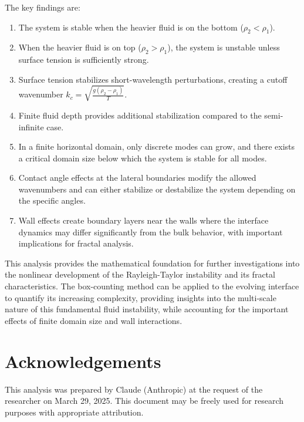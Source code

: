 \documentclass[12pt,a4paper]{article}
\begin{document}
The key findings are:
\begin{enumerate}
    \item The system is stable when the heavier fluid is on the bottom ($\rho_2 < \rho_1$).
    \item When the heavier fluid is on top ($\rho_2 > \rho_1$), the system is unstable unless surface tension is sufficiently strong.
    \item Surface tension stabilizes short-wavelength perturbations, creating a cutoff wavenumber $k_c = \sqrt{\frac{g(\rho_2 - \rho_1)}{T}}$.
    \item Finite fluid depth provides additional stabilization compared to the semi-infinite case.
    \item In a finite horizontal domain, only discrete modes can grow, and there exists a critical domain size below which the system is stable for all modes.
    \item Contact angle effects at the lateral boundaries modify the allowed wavenumbers and can either stabilize or destabilize the system depending on the specific angles.
    \item Wall effects create boundary layers near the walls where the interface dynamics may differ significantly from the bulk behavior, with important implications for fractal analysis.
\end{enumerate}

This analysis provides the mathematical foundation for further investigations into the nonlinear development of the Rayleigh-Taylor instability and its fractal characteristics. The box-counting method can be applied to the evolving interface to quantify its increasing complexity, providing insights into the multi-scale nature of this fundamental fluid instability, while accounting for the important effects of finite domain size and wall interactions.

\section*{Acknowledgements}
This analysis was prepared by Claude (Anthropic) at the request of the researcher on March 29, 2025. This document may be freely used for research purposes with appropriate attribution.
\end{document}
